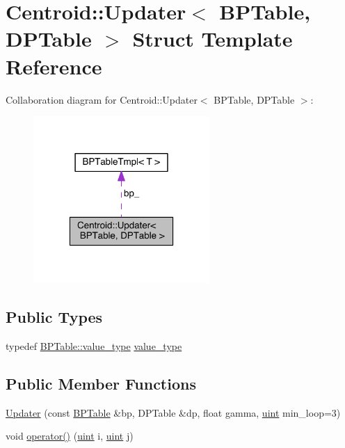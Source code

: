 \hypertarget{struct_centroid_1_1_updater}{\section{Centroid\+:\+:Updater$<$ B\+P\+Table, D\+P\+Table $>$ Struct Template Reference}
\label{struct_centroid_1_1_updater}
}


Collaboration diagram for Centroid\+:\+:Updater$<$ B\+P\+Table, D\+P\+Table $>$\+:
\nopagebreak
\begin{figure}[H]
\begin{center}
\leavevmode
\includegraphics[width=190pt]{struct_centroid_1_1_updater__coll__graph}
\end{center}
\end{figure}
\subsection*{Public Types}
\begin{DoxyCompactItemize}
\item 
typedef \hyperlink{class_b_p_table_tmpl_abeaa8313585c7a571fae9d26211432a6}{B\+P\+Table\+::value\+\_\+type} \hyperlink{struct_centroid_1_1_updater_a2cee1d3de499b9e7ccd74269e0e6a9f1}{value\+\_\+type}
\end{DoxyCompactItemize}
\subsection*{Public Member Functions}
\begin{DoxyCompactItemize}
\item 
\hyperlink{struct_centroid_1_1_updater_a6795a481a92745fe3f9862f94bf32b53}{Updater} (const \hyperlink{folding__engine_8h_a065821fb17bbd8df315f2435c973e3c1}{B\+P\+Table} \&bp, D\+P\+Table \&dp, float gamma, \hyperlink{cyktable_8h_a91ad9478d81a7aaf2593e8d9c3d06a14}{uint} min\+\_\+loop=3)
\item 
void \hyperlink{struct_centroid_1_1_updater_ac49581ce8b3b3f79e676d6b99d2c7756}{operator()} (\hyperlink{cyktable_8h_a91ad9478d81a7aaf2593e8d9c3d06a14}{uint} i, \hyperlink{cyktable_8h_a91ad9478d81a7aaf2593e8d9c3d06a14}{uint} j)
\end{DoxyCompactItemize}
